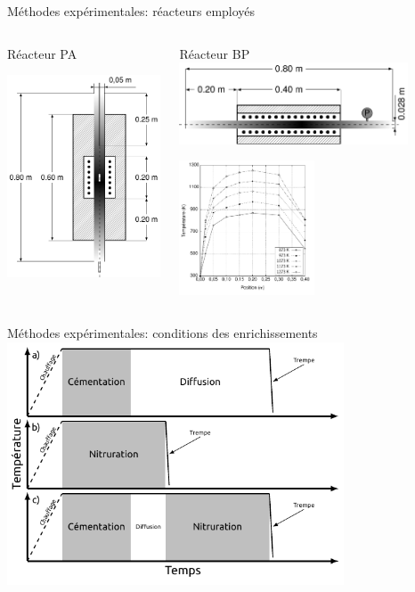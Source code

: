 \documentclass[aspectratio=169,pdf,t]{beamer}
\begin{document}
\begin{frame}{\insertsection}{Méthodes expérimentales: réacteurs employés}
	\begin{columns}[T]
		\begin{column}{0.4\textwidth}
			\centering{}
			Réacteur PA
			\vspace{0.3cm}
			
			\includegraphics[width=5cm]{figures/reacteur_pa}
		\end{column}
		\begin{column}{0.6\textwidth}
			\centering{}
			Réacteur BP
			\vspace{0.3cm}
			\hspace{0.6cm}\includegraphics[width=6.8cm]{figures/reacteur_bp}
			
			\includegraphics[width=4cm]{figures/reacteur_bp_temperature}
		\end{column}
	\end{columns}
\end{frame}


\begin{frame}{\insertsection}{Méthodes expérimentales: conditions des enrichissements}
  \centering{}
  \includegraphics[width=10cm]{figures/heat_cycles}
\end{frame}
\end{document}
